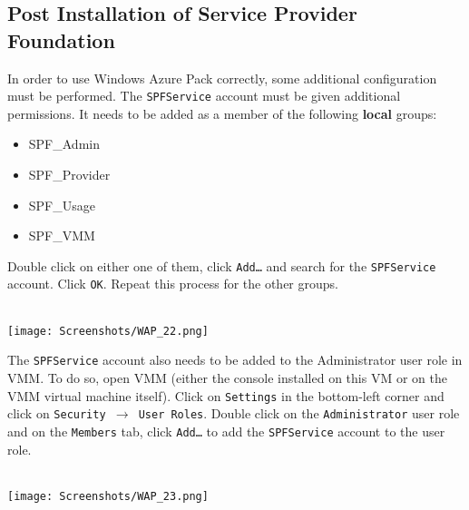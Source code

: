 \clearpage

\subsection{Post Installation of Service Provider Foundation}

In order to use Windows Azure Pack correctly, some additional configuration must be performed. The \texttt{SPFService} account must be given additional permissions. It needs to be added as a member of the following \textbf{local} groups:
\begin{itemize}
\item SPF\_Admin
\item SPF\_Provider
\item SPF\_Usage
\item SPF\_VMM
\end{itemize}
Double click on either one of them, click \texttt{Add\ldots} and search for the \texttt{SPFService} account. Click \texttt{OK}. Repeat this process for the other groups.
$\;$ \\ \\
\noindent\begin{minipage}{\textwidth}
    \centering
    \texttt{[image: Screenshots/WAP\_22.png]}
\end{minipage}

\clearpage

The \texttt{SPFService} account also needs to be added to the Administrator user role in VMM. To do so, open VMM (either the console installed on this VM or on the VMM virtual machine itself). Click on \texttt{Settings} in the bottom-left corner and click on \texttt{Security $\rightarrow$ User Roles}. Double click on the \texttt{Administrator} user role and on the \texttt{Members} tab, click \texttt{Add\ldots} to add the \texttt{SPFService} account to the user role.
$\;$ \\ \\
\noindent\begin{minipage}{\textwidth}
    \centering
    \texttt{[image: Screenshots/WAP\_23.png]}
\end{minipage}

\clearpage

